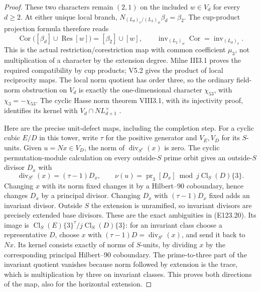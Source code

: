 \begin{proof}
These two characters remain $(2,1)$ on the included $w\in V_d$
for every $d\ge2$. At either unique local branch,
$N_{(L_d)_v/(L_2)_w}\beta_d=\beta_2$. The cup-product projection
formula therefore reads
\[
 \operatorname{Cor}\bigl([\beta_d]\cup\operatorname{Res}[w]\bigr)
       =[\beta_2]\cup[w],\qquad
 \operatorname{inv}_{(L_2)_w}\operatorname{Cor}
       =\operatorname{inv}_{(L_d)_v}.
 \tag{E123.19}
\]
This is the actual restriction/corestriction map with common
coefficient $\mu_3$, not multiplication of a character by the
extension degree. Milne III3.1 proves the required compatibility
by cup products; V5.2 gives the product of local reciprocity maps.
The local norm quotient has order three, so the ordinary field-norm
obstruction on $V_d$ is exactly the one-dimensional character
$\chi_{53}$, with $\chi_3=-\chi_{53}$.
The cyclic Hasse norm theorem VIII3.1, with its injectivity proof,
identifies its kernel with $V_d\cap N L_{d+1}^{\times}$
\cite{E_MilneCFT}.

Here are the precise unit-defect maps, including the completion
step. For a cyclic cubic $E/D$ in this tower, write $\tau$ for the
positive generator and $V_E,V_D$ for its $S$-units. Given
$u=Nx\in V_D$, the norm of $\operatorname{div}_{S^c}(x)$ is zero.
The cyclic permutation-module calculation on every outside-$S$
prime orbit gives an outside-$S$ divisor $D_x$ with
\[
 \operatorname{div}_{S^c}(x)=(\tau-1)D_x,\qquad
 \nu(u)=\operatorname{pr}_3[D_x]\bmod j\operatorname{Cl}_S(D)\{3\}.
 \tag{E123.20}
\]
Changing $x$ with its norm fixed changes it by a Hilbert--90
coboundary, hence changes $D_x$ by a principal divisor.
Changing $D_x$ with $(\tau-1)D_x$ fixed adds an invariant divisor.
Outside $S$ the extension is unramified, so invariant divisors
are precisely extended base divisors. These are the exact
ambiguities in (E123.20).
Its image is
$\operatorname{Cl}_S(E)\{3\}^{\tau}/j\operatorname{Cl}_S(D)\{3\}$:
for an invariant class choose a representative $D$, choose $x$
with $(\tau-1)D=\operatorname{div}_{S^c}(x)$, and send it back
to $Nx$. Its kernel consists exactly of norms of $S$-units,
by dividing $x$ by the corresponding principal Hilbert--90
coboundary. The prime-to-three part of the invariant quotient
vanishes because norm followed by extension is the trace,
which is multiplication by three on invariant classes.
This proves both directions of the map, also for the
horizontal extension.


\end{proof}

